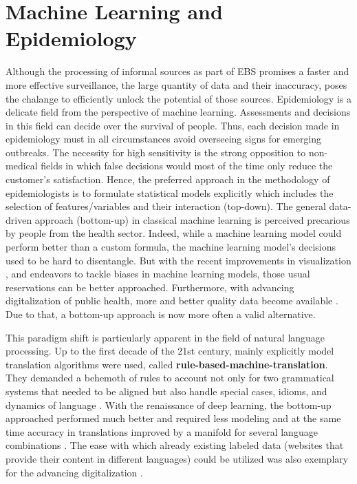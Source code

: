 \section{Machine Learning and Epidemiology}
Although the processing of informal sources as part of EBS promises a faster and more effective surveillance, the large quantity of data and their inaccuracy, poses the chalange to efficiently unlock the potential of those sources.
Epidemiology is a delicate field from the perspective of machine learning.
Assessments and decisions in this field can decide over the survival of people.
Thus, each decision made in epidemiology must in all circumstances avoid overseeing signs for emerging outbreaks.
The necessity for high sensitivity is the strong opposition to non-medical fields in which false decisions would most of the time only reduce the customer's satisfaction.
Hence, the preferred approach in the methodology of epidemiologists is to formulate statistical models explicitly which includes the selection of features/variables and their interaction (top-down).
The general data-driven approach (bottom-up) in classical machine learning is perceived precarious by people from the health sector.
Indeed, while a machine learning model could perform better than a custom formula, the machine learning model's decisions used to be hard to disentangle.
But with the recent improvements in visualization \citep{Arras2017}, and endeavors to tackle biases in machine learning models, those usual reservations can be better approached.
Furthermore, with advancing digitalization of public health, more and better quality data become available \citep{DEMIS}.
Due to that, a bottom-up approach is now more often a valid alternative.

This paradigm shift is particularly apparent in the field of natural language processing.
Up to the first decade of the 21st century, mainly explicitly model translation algorithms were used, called \textbf{rule-based-machine-translation}.
They demanded a behemoth of rules to account not only for two grammatical systems that needed to be aligned but also handle special cases, idioms, and dynamics of language \citep{Bar-Hillel1953, Bar-Hillel1960}.
With the renaissance of deep learning, the bottom-up approached performed much better and required less modeling and at the same time accuracy in translations improved by a manifold for several language combinations \citep{Bengio2003}.
The ease with which already existing labeled data (websites that provide their content in different languages) could be utilized was also exemplary for the advancing digitalization \citep{Macklovitch00}.

